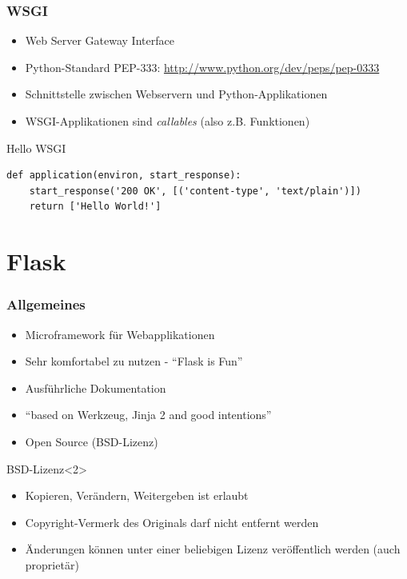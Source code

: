 \documentclass{beamer}
\begin{document}
\begin{frame}[fragile]
  \frametitle{WSGI}
  \begin{itemize}
    \item Web Server Gateway Interface
    \item Python-Standard PEP-333: \url{http://www.python.org/dev/peps/pep-0333}
    \item Schnittstelle zwischen Webservern und Python-Applikationen
    \item WSGI-Applikationen sind \emph{callables} (also z.B. Funktionen)
  \end{itemize}
  \begin{exampleblock}{Hello WSGI}
    \begin{lstlisting}
def application(environ, start_response):
    start_response('200 OK', [('content-type', 'text/plain')])
    return ['Hello World!']
    \end{lstlisting}
  \end{exampleblock}
\end{frame}

\section{Flask}
\begin{frame}
  \frametitle{Allgemeines}
  \begin{itemize}
    \item Microframework für Webapplikationen
    \item Sehr komfortabel zu nutzen - \enquote{Flask is Fun}
    \item Ausführliche Dokumentation
    \item \enquote{based on Werkzeug, Jinja 2 and good intentions}
    \item Open Source (BSD-Lizenz)
  \end{itemize}

  \begin{block}{BSD-Lizenz}<2>
    \begin{itemize}
      \item Kopieren, Verändern, Weitergeben ist erlaubt
      \item Copyright-Vermerk des Originals darf nicht entfernt werden
      \item Änderungen können unter einer beliebigen Lizenz veröffentlich werden (auch proprietär)
    \end{itemize}
  \end{block}
\end{frame}
\end{document}
